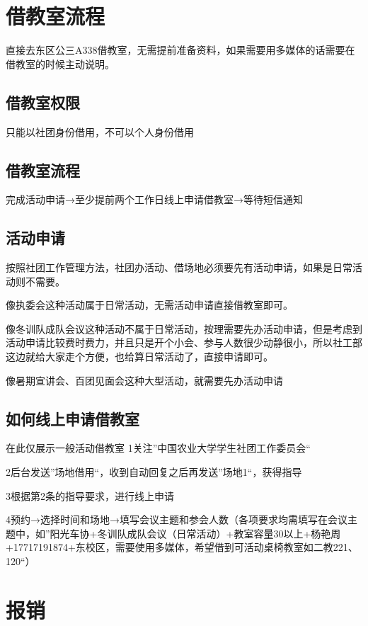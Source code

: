 \documentclass{ctexbook}
\begin{document}
\section{借教室流程}
\label{sec:借教室}
直接去东区公三A338借教室，无需提前准备资料，如果需要用多媒体的话需要在借教室的时候主动说明。

\subsection{借教室权限}
只能以社团身份借用，不可以个人身份借用
\subsection{借教室流程}
完成活动申请→至少提前两个工作日线上申请借教室→等待短信通知
\subsection{活动申请}
按照社团工作管理方法，社团办活动、借场地必须要先有活动申请，如果是日常活动则不需要。

像执委会这种活动属于日常活动，无需活动申请直接借教室即可。

像冬训队成队会议这种活动不属于日常活动，按理需要先办活动申请，但是考虑到活动申请比较费时费力，并且只是开个小会、参与人数很少动静很小，所以社工部这边就给大家走个方便，也给算日常活动了，直接申请即可。

像暑期宣讲会、百团见面会这种大型活动，就需要先办活动申请
\subsection{如何线上申请借教室}
在此仅展示一般活动借教室
1关注''中国农业大学学生社团工作委员会``

2后台发送''场地借用``，收到自动回复之后再发送''场地1``，获得指导

3根据第2条的指导要求，进行线上申请

4预约→选择时间和场地→填写会议主题和参会人数（各项要求均需填写在会议主题中，如''阳光车协+冬训队成队会议（日常活动）+教室容量30以上+杨艳周+17717191874+东校区，需要使用多媒体，希望借到可活动桌椅教室如二教221、120``）

\section{报销}
\end{document}
